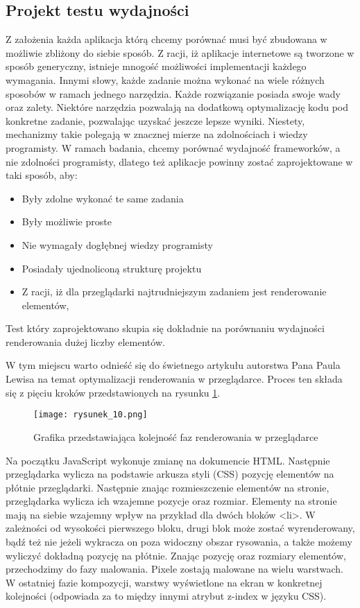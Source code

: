 \subsection{Projekt testu wydajności}
Z założenia każda aplikacja którą chcemy porównać musi być zbudowana w możliwie zbliżony do siebie sposób.
Z racji, iż aplikacje internetowe są tworzone w sposób generyczny, istnieje mnogość możliwości implementacji każdego wymagania.
Innymi słowy, każde zadanie można wykonać na wiele różnych sposobów w ramach jednego narzędzia.
Każde rozwiązanie posiada swoje wady oraz zalety. Niektóre narzędzia pozwalają na dodatkową optymalizację kodu pod konkretne zadanie, pozwalając uzyskać jeszcze lepsze wyniki.
Niestety, mechanizmy takie polegają w znacznej mierze na zdolnościach i wiedzy programisty.
W ramach badania, chcemy porównać wydajność frameworków, a nie zdolności programisty, dlatego też aplikacje powinny zostać zaprojektowane w taki sposób, aby:
\begin{itemize}
    \item Były zdolne wykonać te same zadania
    \item Były możliwie proste
    \item Nie wymagały dogłębnej wiedzy programisty
    \item Posiadały ujednoliconą strukturę projektu
    \item Z racji, iż dla przeglądarki najtrudniejszym zadaniem jest renderowanie elementów,     
\end{itemize}
Test który zaprojektowano skupia się dokładnie na porównaniu wydajności renderowania dużej liczby elementów.

W tym miejscu warto odnieść się do świetnego artykułu autorstwa Pana Paula Lewisa \cite{rendering-performance} na temat optymalizacji renderowania w przeglądarce. Proces ten składa się z pięciu kroków przedstawionych na rysunku \ref{fig:rysunek_10}. 

\begin{figure}[htbp]
    \centering
    \texttt{[image: rysunek\_10.png]}
    \caption{Grafika przedstawiająca kolejność faz renderowania w przeglądarce \cite{rendering-performance}}
    \label{fig:rysunek_10}
\end{figure}

Na początku JavaScript wykonuje zmianę na dokumencie HTML.
Następnie przeglądarka wylicza na podstawie arkusza styli (CSS) pozycję elementów na płótnie przeglądarki.
Następnie znając rozmieszczenie elementów na stronie, przeglądarka wylicza ich wzajemne pozycje oraz rozmiar.
Elementy na stronie mają na siebie wzajemny wpływ na przykład dla dwóch bloków <li>.
W zależności od wysokości pierwszego bloku, drugi blok może zostać wyrenderowany, bądź też nie jeżeli wykracza on poza widoczny obszar rysowania, a także możemy wyliczyć dokładną pozycję na płótnie.
Znając pozycję oraz rozmiary elementów, przechodzimy do fazy malowania.
Pixele zostają malowane na wielu warstwach. W ostatniej fazie kompozycji, warstwy wyświetlone na ekran w konkretnej kolejności (odpowiada za to między innymi atrybut z-index w języku CSS).

